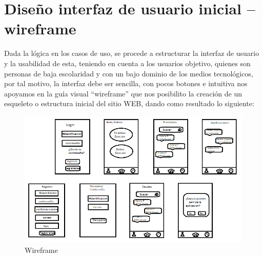 \section{Diseño interfaz de usuario inicial – wireframe}

{Dada la lógica en los casos de uso, se procede a estructurar la interfaz de usuario y la usabilidad de esta, teniendo en cuenta a los usuarios objetivo, quienes son personas de baja escolaridad y con un bajo dominio de los medios tecnológicos, por tal motivo, la interfaz debe ser sencilla, con pocos botones e intuitiva  nos apoyamos en la guía visual “wireframe” que nos posibilito la creación de un esqueleto o estructura inicial del sitio WEB, dando como resultado lo siguiente:

\begin{figure}[H]
	\centering
	\includegraphics[width=1\linewidth]{development/wireframe.png}
	\caption{Wireframe}
\end{figure}
}
